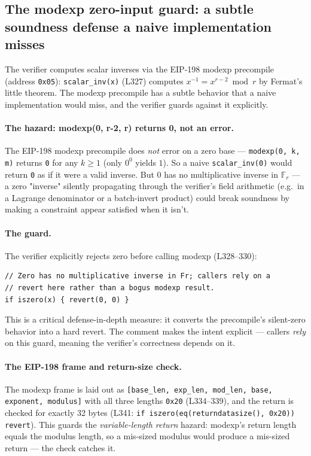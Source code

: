 \subsection{The modexp zero-input guard: a subtle soundness defense a naive implementation misses}
\label{sec:pr-modexp}

The verifier computes scalar inverses via the EIP-198 modexp
precompile (address \texttt{0x05}): \texttt{scalar\_inv(x)}
(L327) computes $x^{-1} = x^{r-2} \bmod r$ by Fermat's little
theorem. The modexp precompile has a subtle behavior that a naive
implementation would miss, and the verifier guards against it
explicitly.

\paragraph{The hazard: modexp(0, r-2, r) returns 0, not an error.}
The EIP-198 modexp precompile does \emph{not} error on a zero
base --- \texttt{modexp(0, k, m)} returns \texttt{0} for any
$k \ge 1$ (only $0^0$ yields $1$). So a naive \texttt{scalar\_inv(0)} would return
\texttt{0} as if it were a valid inverse. But $0$ has no
multiplicative inverse in $\mathbb{F}_r$ --- a zero "inverse"
silently propagating through the verifier's field arithmetic
(e.g.\ in a Lagrange denominator or a batch-invert product) could
break soundness by making a constraint appear satisfied when it
isn't.

\paragraph{The guard.} The verifier explicitly rejects zero before
calling modexp (L328--330):
\begin{lstlisting}[style=yul]
// Zero has no multiplicative inverse in Fr; callers rely on a
// revert here rather than a bogus modexp result.
if iszero(x) { revert(0, 0) }
\end{lstlisting}
This is a critical defense-in-depth measure: it converts the
precompile's silent-zero behavior into a hard revert. The comment
makes the intent explicit --- callers \emph{rely} on this guard,
meaning the verifier's correctness depends on it.

\paragraph{The EIP-198 frame and return-size check.} The modexp
frame is laid out as \texttt{[base\_\allowbreak{}len, exp\_\allowbreak{}len, mod\_\allowbreak{}len, base,
exponent, modulus]} with all three lengths \texttt{0x20}
(L334--339), and the return is checked for exactly 32 bytes
(L341: \texttt{if iszero(eq(returndatasize(), 0x20)) revert}).
This guards the \emph{variable-length return} hazard: modexp's
return length equals the modulus length, so a mis-sized modulus
would produce a mis-sized return --- the check catches it.

